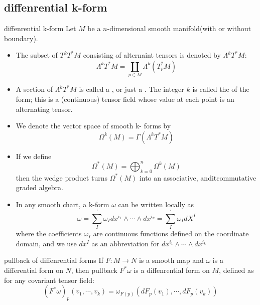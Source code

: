 \documentclass[../main.tex]{subfiles}
\begin{document}
\subsection{diffenrential k-form}
\begin{definition}{diffenrential k-form}{}
    Let \(  M  \) be a \(  n  \)-dimensional smooth manifold(with or without boundary).
    
    \begin{itemize}
        \item The subset of \(  T^{k}T^{*}M  \) consisting of alternaint tensors is denoted by \(   \Lambda ^{k}T^{*}M  \):\[
         \Lambda ^{k}T^{*}M= \coprod  _{p\in M} \Lambda ^{k}\left( T_{p}^{*}M \right) 
        \]  
        \item A section of \(   \Lambda ^{k}T^{*}M  \) is called a , or just a . The integer \(  k   \) is called the  of the form; this is a (continuous) tensor field whose value at each point is an alternating tensor.
        \item We denote the vector space of smooth k- forms by \[
         \Omega ^{k}\left( M \right)=  \Gamma \left(  \Lambda ^{k}T^{*}M \right)  
        \] 
        \item If we define \[
         \Omega ^{*}\left( M \right)= \bigoplus _{k= 0}^{n} \Omega ^{k}\left( M \right)  
        \] then the wedge product turns \(   \Omega ^{*}\left( M \right)   \) into an associative, anditcommutative graded algebra. 
        \item In any smooth chart, a k-form \(   \omega   \) can be written locally as \[
         \omega = \sum _{I}^{\prime}  \omega _{I}d x^{i_1}\wedge \cdots \wedge dx^{i_{k}}= \sum _{I}^{\prime}  \omega _{I}d X^{I}
        \] where the coefficients \(   \omega _{I}  \) are continuous functions defined on the coordinate domain, and we use \(  d x^{I}   \) as an abbreviation for \(  dx^{i_1}\wedge \cdots \wedge dx^{i_{k}}  \)    
    \end{itemize}
    
\end{definition}

\begin{definition}{pullback of diffenrential forms}{}
    If \(  F:M\to N  \) is a smooth map and \(   \omega   \) is a differential form on \(  N  \), then pullback \(  F^{*} \omega   \)     is a diffenrential form on \(  M  \), defined as for any covariant tensor field: \[
    \left( F^{*} \omega  \right)_{p}\left(  v_1,\cdots,v_k  \right)=  \omega _{F\left( p \right) }\left( d F_{p}\left( v_1 \right),\cdots , d F_{p}\left( v_{k} \right)   \right)   
    \] 
\end{definition}
\end{document}
